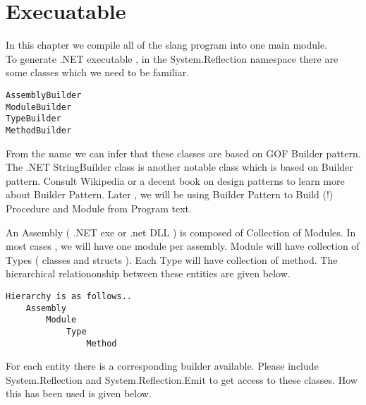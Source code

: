 \section{Execuatable}
In this chapter we compile all of the slang program into one main module.\\
To generate .NET executable , in the System.Reflection namespace there are some classes which we
need to be familiar.
\begin{verbatim}
AssemblyBuilder
ModuleBuilder
TypeBuilder
MethodBuilder
\end{verbatim}

From the name we can infer that these classes are based on GOF Builder pattern. The .NET StringBuilder class is another
notable class which is based on Builder pattern. Consult Wikipedia or a decent book on design patterns to learn more about
Builder Pattern. Later , we will be using Builder Pattern to Build (!) Procedure and Module from Program text.

An Assembly ( .NET exe or .net DLL ) is composed of Collection of Modules. In most cases , we will have one module per
assembly. Module will have collection of Types ( classes and structs ). Each Type will have collection of method. The
hierarchical relationonship between these entities are given below.

\begin{verbatim}
Hierarchy is as follows..
	Assembly
		Module
			Type
				Method
\end{verbatim}

For each entity there is a corresponding builder available. Please include System.Reflection and System.Reflection.Emit to
get access to these classes. How this has been used is given below.

